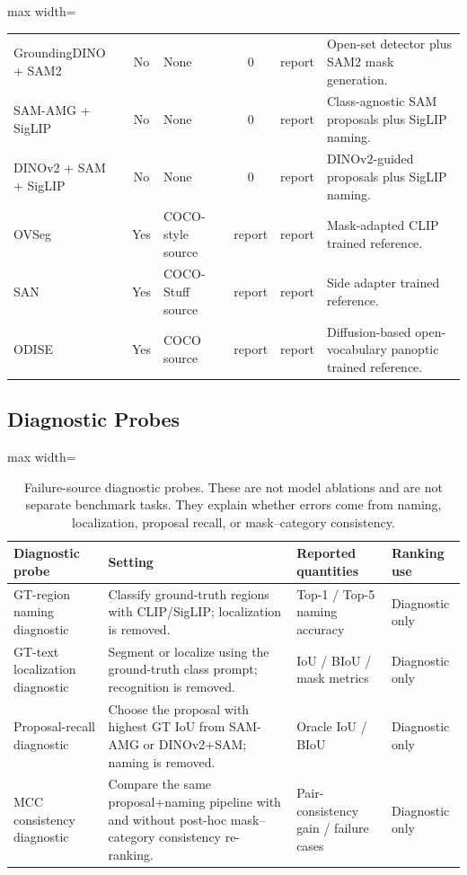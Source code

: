 \documentclass[11pt,a4paper]{article}
\begin{document}
\begin{table}[H]
\begin{adjustbox}{max width=\textwidth}
\begin{tabular}{l c p{} c c p{}}
GroundingDINO + SAM2 & No & None & 0 & report & Open-set detector plus SAM2 mask generation. \\
SAM-AMG + SigLIP & No & None & 0 & report & Class-agnostic SAM proposals plus SigLIP naming. \\
DINOv2 + SAM + SigLIP & No & None & 0 & report & DINOv2-guided proposals plus SigLIP naming. \\
OVSeg & Yes & COCO-style source & report & report & Mask-adapted CLIP trained reference. \\
SAN & Yes & COCO-Stuff source & report & report & Side adapter trained reference. \\
ODISE & Yes & COCO source & report & report & Diffusion-based open-vocabulary panoptic trained reference. \\
\bottomrule
\end{tabular}
\end{adjustbox}
\end{table}

\subsection{Diagnostic Probes}

\begin{table}[H]
\centering
\scriptsize
\caption{Failure-source diagnostic probes. These are not model ablations and are not separate benchmark tasks. They explain whether errors come from naming, localization, proposal recall, or mask--category consistency.}
\label{tab:diagnostic-probes}
\begin{adjustbox}{max width=\textwidth}
\begin{tabular}{p{} p{} p{} p{}}
\toprule
Diagnostic probe & Setting & Reported quantities & Ranking use \\
\midrule
GT-region naming diagnostic & Classify ground-truth regions with CLIP/SigLIP; localization is removed. & Top-1 / Top-5 naming accuracy & Diagnostic only \\
GT-text localization diagnostic & Segment or localize using the ground-truth class prompt; recognition is removed. & IoU / BIoU / mask metrics & Diagnostic only \\
Proposal-recall diagnostic & Choose the proposal with highest GT IoU from SAM-AMG or DINOv2+SAM; naming is removed. & Oracle IoU / BIoU & Diagnostic only \\
MCC consistency diagnostic & Compare the same proposal+naming pipeline with and without post-hoc mask--category consistency re-ranking. & Pair-consistency gain / failure cases & Diagnostic only \\
\bottomrule
\end{tabular}
\end{adjustbox}
\end{table}
\end{document}
